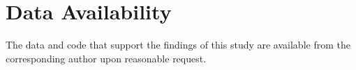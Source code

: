 \section*{Data Availability}
\label{sec:data_availability}

The data and code that support the findings of this study are available from the corresponding author upon reasonable request.

